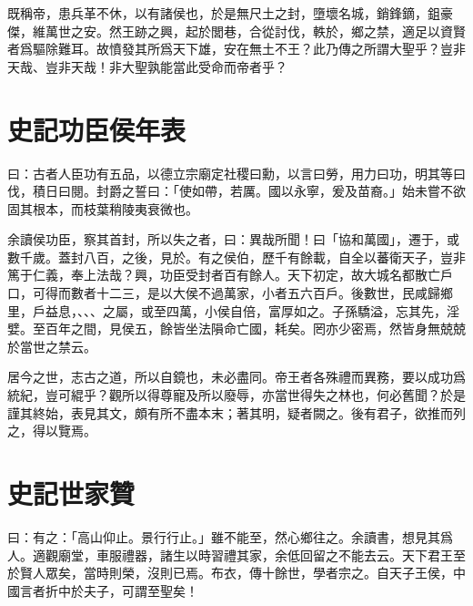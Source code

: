 既稱帝，患兵革不休，以有諸侯也，於是無尺土之封，墮壞名城，銷鋒鏑，鉏豪傑，維萬世之安。然王跡之興，起於閭巷，合從討伐，軼於，鄉之禁，適足以資賢者爲驅除難耳。故憤發其所爲天下雄，安在無土不王？此乃傳之所謂大聖乎？豈非天哉、豈非天哉！非大聖孰能當此受命而帝者乎？

\section[高祖功臣侯年表\quad{\small 史記}]{{\normalsize 史記}\quad{}功臣侯年表}
曰：古者人臣功有五品，以德立宗廟定社稷曰勳，以言曰勞，用力曰功，明其等曰伐，積日曰閱。封爵之誓曰：「使如帶，若厲。國以永寧，爰及苗裔。」始未嘗不欲固其根本，而枝葉稍陵夷衰微也。

余讀侯功臣，察其首封，所以失之者，曰：異哉所聞！曰「協和萬國」，遷于，或數千歲。蓋封八百，之後，見於。有之侯伯，歷千有餘載，自全以蕃衛天子，豈非篤于仁義，奉上法哉？興，功臣受封者百有餘人。天下初定，故大城名都散亡戶口，可得而數者十二三，是以大侯不過萬家，小者五六百戶。後數世，民咸歸鄉里，戶益息，、、、之屬，或至四萬，小侯自倍，富厚如之。子孫驕溢，忘其先，淫嬖。至百年之間，見侯五，餘皆坐法隕命亡國，耗矣。罔亦少密焉，然皆身無兢兢於當世之禁云。

居今之世，志古之道，所以自鏡也，未必盡同。帝王者各殊禮而異務，要以成功爲統紀，豈可緄乎？觀所以得尊寵及所以廢辱，亦當世得失之林也，何必舊聞？於是謹其終始，表見其文，頗有所不盡本末；著其明，疑者闕之。後有君子，欲推而列之，得以覽焉。

\section[孔子世家贊\quad{\small 史記}]{{\normalsize 史記}\quad{}世家贊}
曰：有之：「高山仰止。景行行止。」雖不能至，然心鄉往之。余讀書，想見其爲人。適觀廟堂，車服禮器，諸生以時習禮其家，余低回留之不能去云。天下君王至於賢人眾矣，當時則榮，沒則已焉。布衣，傳十餘世，學者宗之。自天子王侯，中國言者折中於夫子，可謂至聖矣！

